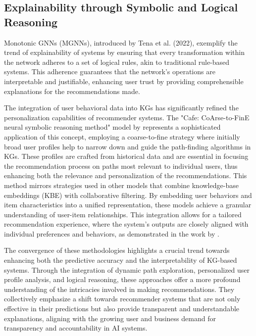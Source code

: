 \subsection{Explainability through Symbolic and Logical Reasoning}

Monotonic GNNs (MGNNs), introduced by Tena et al. (2022), exemplify the trend of
explainability of systems by ensuring that every transformation within the network
adheres to a set of logical rules, akin to traditional rule-based systems. This adherence
guarantees that the network's operations are interpretable and justifiable,
enhancing user trust by providing comprehensible explanations for the
recommendations made.

The integration of user behavioral data into KGs has significantly refined the
personalization capabilities of recommender systems. The "Cafe: CoArse-to-FinE neural
symbolic reasoning method" model by \textcite{xian_cafe_2020} represents a sophisticated
application of this concept, employing a coarse-to-fine strategy where initially
broad user profiles help to narrow down and guide the path-finding algorithms in
KGs. These profiles are crafted from historical data and are essential in focusing
the recommendation process on paths most relevant to individual users, thus
enhancing both the relevance and personalization of the recommendations. This method
mirrors strategies used in other models that combine knowledge-base embeddings (KBE)
with collaborative filtering. By embedding user behaviors and item
characteristics into a unified representation, these models achieve a granular understanding
of user-item relationships. This integration allows for a tailored
recommendation experience, where the system's outputs are closely aligned with individual
preferences and behaviors, as demonstrated in the work by \textcite{ai_learning_2018}.

The convergence of these methodologies highlights a crucial trend towards enhancing
both the predictive accuracy and the interpretability of KG-based systems.
Through the integration of dynamic path exploration, personalized user profile analysis,
and logical reasoning, these approaches offer a more profound understanding of the
intricacies involved in making recommendations. They collectively emphasize a
shift towards recommender systems that are not only effective in their
predictions but also provide transparent and understandable explanations, aligning
with the growing user and business demand for transparency and accountability in
AI systems.

